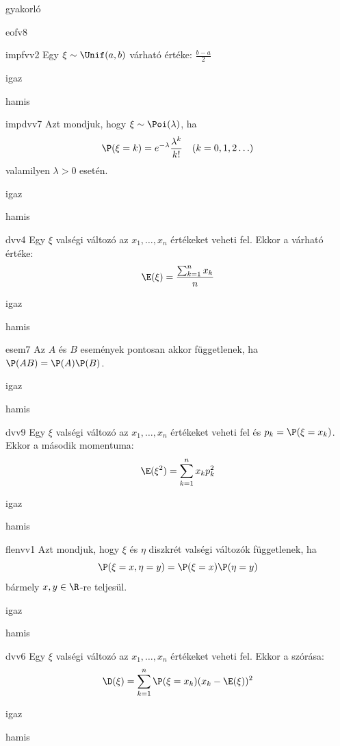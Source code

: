 \documentclass[12pt]{article}
\begin{document}
\begin{quiz}{gyakorló}
\begin{multi}[feedback={Diszkrét v.v.-ra ez nem feltétlen igaz, ha $a$-t pozitív valséggel felveszi.}]{eofv8}
\end{multi}
\begin{multi}[feedback={wiki}]{impfvv2}
Egy $\xi\sim \Unif(a,b)$ várható értéke: $\frac{b-a}{2}$
\item igaz
\item* hamis
\end{multi}
\begin{multi}[feedback={Def.}]{impdvv7}
Azt mondjuk, hogy $\xi\sim \Poi(\lambda)$, ha 
$$
\P(\xi=k)=e^{-\lambda}\frac{\lambda^k}{k!}\ \ \ (k=0,1,2\ldots )
$$ 
valamilyen $\lambda>0$ esetén.
\item* igaz
\item hamis
\end{multi}
\begin{multi}[feedback={Ez csak egyenletesre igaz.}]{dvv4}
Egy $\xi$ valségi változó az $x_1,\ldots, x_n$ értékeket veheti fel. Ekkor a várható értéke:
$$
\E(\xi)=\frac{\sum_{k=1}^n x_k}{n}
$$
\item igaz
\item* hamis
\end{multi}
\begin{multi}[feedback={Definíció.}]{esem7}
Az $A$ és $B$ események pontosan akkor függetlenek, ha $\P(AB)=\P(A)\P(B)$.
\item* igaz
\item hamis
\end{multi}
\begin{multi}[feedback={Def.}]{dvv9}
Egy $\xi$ valségi változó az $x_1,\ldots, x_n$ értékeket veheti fel és $p_k=\P(\xi=x_k)$. 
Ekkor a második momentuma:
$$
\E(\xi^2)=\sum_{k=1}^n x_k p_k^2
$$
\item igaz
\item* hamis
\end{multi}
\begin{multi}[feedback={Def.}]{flenvv1}
Azt mondjuk, hogy $\xi$ és $\eta$ diszkrét valségi változók függetlenek, ha
$$
\P(\xi=x,\eta=y)=\P(\xi=x)\P(\eta=y)
$$
bármely $x,y\in \R$-re teljesül.
\item* igaz
\item hamis
\end{multi}
\begin{multi}[feedback={Def.}]{dvv6}
Egy $\xi$ valségi változó az $x_1,\ldots, x_n$ értékeket veheti fel. Ekkor a szórása:
$$
\D(\xi)=\sum_{k=1}^n \P(\xi=x_k)(x_k-\E(\xi))^2
$$
\item igaz
\item* hamis
\end{multi}
\end{quiz}
\end{document}
